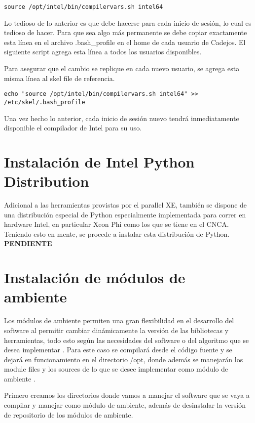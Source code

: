 \begin{lstlisting}
source /opt/intel/bin/compilervars.sh intel64
\end{lstlisting}

Lo tedioso de lo anterior es que debe hacerse para cada inicio de sesión, lo cual es tedioso de hacer. Para que sea algo más permanente se debe copiar exactamente esta línea en el archivo .bash\_profile en el home de cada usuario de Cadejos. El siguiente script agrega esta línea a todos los usuarios disponibles.



Para asegurar que el cambio se replique en cada nuevo usuario, se agrega esta misma línea al skel file de referencia.

\begin{lstlisting}
echo "source /opt/intel/bin/compilervars.sh intel64" >> /etc/skel/.bash_profile
\end{lstlisting}

Una vez hecho lo anterior, cada inicio de sesión nuevo tendrá inmediatamente disponible el compilador de Intel para su uso.

\section{Instalación de Intel Python Distribution}
Adicional a las herramientas provistas por el parallel XE, también se dispone de una distribución especial de Python especialmente implementada para correr en hardware Intel, en particular Xeon Phi como los que se tiene en el CNCA. Teniendo esto en mente, se procede a instalar esta distribución de Python.
\textbf{\huge{PENDIENTE}}


\section{Instalación de módulos de ambiente}
Los módulos de ambiente permiten una gran flexibilidad en el desarrollo del software al permitir cambiar dinámicamente la versión de las bibliotecas y herramientas, todo esto según las necesidades del software o del algoritmo que se desea implementar \cite{modules}. Para este caso se compilará desde el código fuente y se dejará en funcionamiento en el directorio /opt, donde además se manejarán los module files y los sources de lo que se desee implementar como módulo de ambiente \cite{moduleinstall}. 

Primero creamos los directorios donde vamos a manejar el software que se vaya a compilar y manejar como módulo de ambiente, además de desinstalar la versión de repositorio de los módulos de ambiente.

